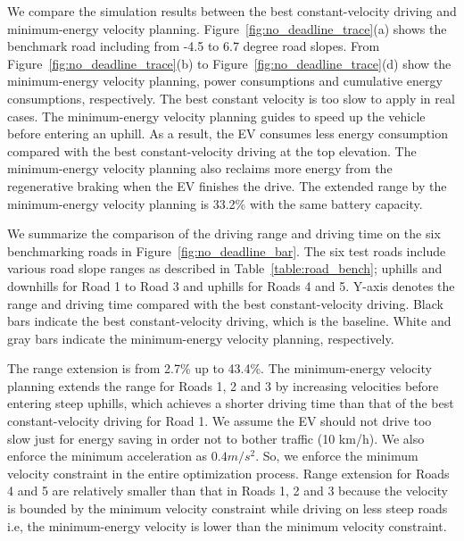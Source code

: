 \documentclass{IEEEtran}
\begin{document}
We compare the simulation results between the best constant-velocity driving and minimum-energy velocity planning. Figure~\ref{fig:no_deadline_trace}(a) shows the benchmark road including from -4.5 to 6.7 degree road slopes. From Figure~\ref{fig:no_deadline_trace}(b) to Figure~\ref{fig:no_deadline_trace}(d) show the minimum-energy velocity planning, power consumptions and cumulative energy consumptions, respectively. The best constant velocity is too slow to apply in real cases. The minimum-energy velocity planning guides to speed up the vehicle before entering an uphill. As a result, the EV consumes less energy consumption compared with the best constant-velocity driving at the top elevation. The minimum-energy velocity planning also reclaims more energy from the regenerative braking when the EV finishes the drive. The extended range by the minimum-energy velocity planning is 33.2\% with the same battery capacity.

We summarize the comparison of the driving range and driving time on the six benchmarking roads in Figure~\ref{fig:no_deadline_bar}. The six test roads include various road slope ranges as described in Table~\ref{table:road_bench}; uphills and downhills for Road 1 to Road 3 and uphills for Roads 4 and 5. Y-axis denotes the range and driving time compared with the best constant-velocity driving. Black bars indicate the best constant-velocity driving, which is the baseline. White and gray bars indicate the minimum-energy velocity planning, respectively.

The range extension is from 2.7\% up to 43.4\%. The minimum-energy velocity planning extends the range for Roads 1, 2 and  3 by increasing velocities before entering steep uphills, which achieves a shorter driving time than that of the best constant-velocity driving for Road 1. We assume the EV should not drive too slow just for energy saving in order not to bother traffic (10 km/h). We also enforce the minimum acceleration as $ 0.4 m/s^2$. So, we enforce the minimum velocity constraint in the entire optimization process. Range extension for Roads 4 and 5 are relatively smaller than that in Roads 1, 2 and 3 because the velocity is bounded by the minimum velocity constraint while driving on less steep roads i.e, the minimum-energy velocity is lower than the minimum velocity constraint.

\end{document}
